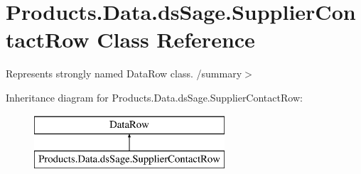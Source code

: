 \hypertarget{class_products_1_1_data_1_1ds_sage_1_1_supplier_contact_row}{}\section{Products.\+Data.\+ds\+Sage.\+Supplier\+Contact\+Row Class Reference}
\label{class_products_1_1_data_1_1ds_sage_1_1_supplier_contact_row}


Represents strongly named Data\+Row class. /summary$>$  


Inheritance diagram for Products.\+Data.\+ds\+Sage.\+Supplier\+Contact\+Row\+:\begin{figure}[H]
\begin{center}
\leavevmode
\includegraphics[height=2.000000cm]{class_products_1_1_data_1_1ds_sage_1_1_supplier_contact_row}
\end{center}
\end{figure}
